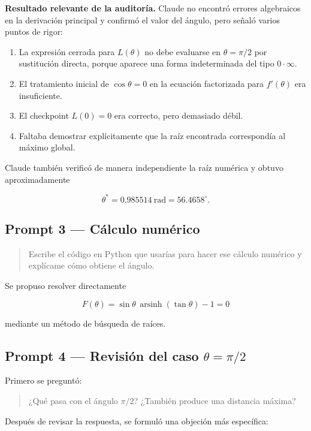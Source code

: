 \textbf{Resultado relevante de la auditoría.} Claude no encontró errores algebraicos en la derivación principal y confirmó el valor del ángulo, pero señaló varios puntos de rigor:

\begin{enumerate}
    \item La expresión cerrada para \(L(\theta)\) no debe evaluarse en \(\theta=\pi/2\) por sustitución directa, porque aparece una forma indeterminada del tipo \(0\cdot\infty\).
    \item El tratamiento inicial de \(\cos\theta=0\) en la ecuación factorizada para \(f'(\theta)\) era insuficiente.
    \item El checkpoint \(L(0)=0\) era correcto, pero demasiado débil.
    \item Faltaba demostrar explícitamente que la raíz encontrada correspondía al máximo global.
\end{enumerate}

Claude también verificó de manera independiente la raíz numérica y obtuvo aproximadamente

\[
\theta^*=0.985514\ \text{rad}
=56.4658^\circ.
\]

\subsection*{Prompt 3 --- Cálculo numérico}

\begin{quote}
Escribe el código en Python que usarías para hacer ese cálculo numérico y explícame cómo obtiene el ángulo.
\end{quote}

Se propuso resolver directamente

\[
F(\theta)
=
\sin\theta\,\operatorname{arsinh}(\tan\theta)-1=0
\]

mediante un método de búsqueda de raíces.

\subsection*{Prompt 4 --- Revisión del caso \(\theta=\pi/2\)}

Primero se preguntó:

\begin{quote}
¿Qué pasa con el ángulo \(\pi/2\)? ¿También produce una distancia máxima?
\end{quote}

Después de revisar la respuesta, se formuló una objeción más específica:

